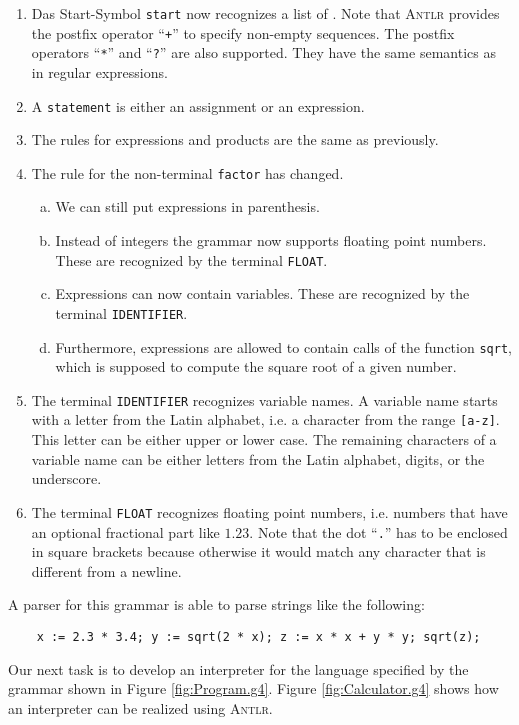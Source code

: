 \begin{enumerate}
\item Das Start-Symbol \texttt{start} now recognizes a list of .
      Note that \textsc{Antlr} provides the postfix operator ``\texttt{+}'' to
      specify non-empty sequences.  The postfix operators ``\texttt{*}'' and ``\texttt{?}'' are also 
      supported.  They have the same semantics as in regular expressions.
\item A \texttt{statement} is either an assignment or an expression.
\item The rules for expressions and products are the same as previously.
\item The rule for the non-terminal \texttt{factor} has changed.
      \begin{enumerate}[(a)]
      \item We can still put expressions in parenthesis.
      \item Instead of integers the grammar now supports floating point numbers.
            These are recognized by the terminal \texttt{FLOAT}.
      \item Expressions can now contain variables.  These are recognized by the terminal
            \texttt{IDENTIFIER}.
      \item Furthermore, expressions are allowed to contain calls of the function \texttt{sqrt},
            which is supposed to compute the square root of a given number.
      \end{enumerate}
\item The terminal \texttt{IDENTIFIER} recognizes variable names.  A variable name starts with 
      a letter from the Latin alphabet, i.e. a character from the range \texttt{[a-z]}.  This letter can be either
      upper or lower case.  The remaining characters of a variable name can be either letters from the Latin
      alphabet, digits, or the underscore.
\item The terminal \texttt{FLOAT} recognizes floating point numbers, i.e. numbers that have an optional
      fractional part like $1.23$.  Note that the dot ``\texttt{.}'' has to be enclosed in square
      brackets because otherwise it would match any character that is different from a newline.  
\end{enumerate}
A parser for this grammar is able to parse strings like the following:
\begin{verbatim}
    x := 2.3 * 3.4; y := sqrt(2 * x); z := x * x + y * y; sqrt(z);
\end{verbatim}
Our next task is to develop an interpreter for the language specified by the grammar shown 
in Figure \ref{fig:Program.g4}.  Figure \ref{fig:Calculator.g4} shows how an interpreter can be realized using
\textsc{Antlr}. 


